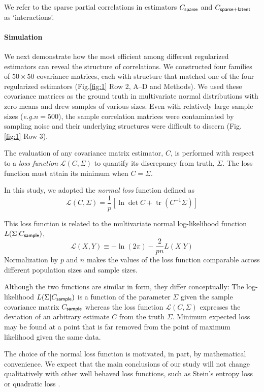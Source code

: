 \documentclass[10pt]{article}
\DeclareMathOperator{\Tr}{tr}
\newcommand{\sq}[1]{\lq#1\rq}
\newcommand{\figref}[2]{Fig.\;\ref{fig:#1}\,#2}
\newcommand{\loss}[1]{\mathcal L\left(#1\right)}
\newcommand{\eg}{\emph{e.g.}\;}
\begin{document}
We refer to the sparse partial correlations in estimators $C_{\sf sparse}$ and $C_{\sf sparse+latent}$ as \sq{interactions}.

\paragraph{Simulation}
We next demonstrate how the most efficient among different regularized estimators can reveal the structure of correlations.
We constructed four families of $50\times 50$ covariance matrices, each with structure that matched one of the four regularized estimators (\figref{1}{\,Row 2, A--D} and Methods).  We used these covariance matrices as the ground truth in multivariate normal distributions with zero means and drew samples of various sizes. Even with relatively large sample sizes (\eg $n=500$), the sample correlation matrices were contaminated by sampling noise and their underlying structures were difficult to discern (\figref{1}{\,Row 3}). 

The evaluation of any covariance matrix estimator, $C$, is performed with respect to a \emph{loss function} $\loss{C,\Sigma}$ to quantify its discrepancy from truth, $\Sigma$.  The loss function must attain its minimum when $C=\Sigma$.

In this study, we adopted the \emph{normal loss} function defined as
\begin{equation}\label{eq:loss}
    \loss{C,\Sigma} = \frac 1 p\left[\ln \det C + \Tr(C^{-1}\Sigma)\right]
\end{equation}

This loss function is related to the multivariate normal log-likelihood function $L(\Sigma|C_{\sf sample})$,
\begin{equation}
	\loss{X,Y} \equiv -\ln(2\pi) - \frac 2 {pn} L(X|Y)
\end{equation}
Normalization by $p$ and $n$ makes the values of the loss function comparable across different population sizes and sample sizes.

Although the two functions are similar in form, they differ conceptually: The log-likelihood $L(\Sigma|C_{\sf sample})$ is a function of the parameter $\Sigma$ given the sample covariance matrix $C_{\sf sample}$ whereas the loss function $\loss{C,\Sigma}$ expresses the deviation of an arbitrary estimate $C$ from the truth $\Sigma$. Minimum expected loss may be found at a point that is far removed from the point of maximum likelihood given the same data.

The choice of the normal loss function is motivated, in part, by mathematical convenience. We expect that the main conclusions of our study will not change qualitatively with other well behaved loss functions, such as Stein's entropy loss or quadratic loss \cite{James:1961, Fan:2008, Ledoit:2004, Schafer:2005}.  
\end{document}
